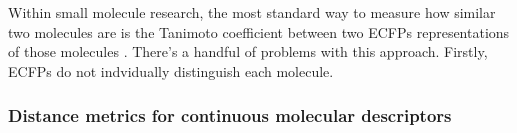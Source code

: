 %
%
%

Within small molecule research, the most standard way to measure how similar two molecules are is the Tanimoto coefficient between two ECFPs representations of those molecules \citep{Capecchi2020, LopezPerez2024}. There's a handful of problems with this approach. Firstly, ECFPs do not indvidually distinguish each molecule.

\subsubsection{Distance metrics for continuous molecular descriptors}
%


